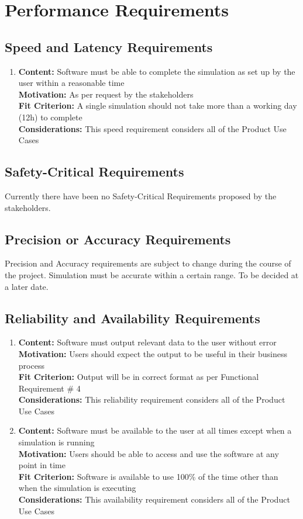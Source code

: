 \documentclass[paper=letter, fontsize=10pt]{scrartcl}
\numberwithin{equation}{section}		%
\numberwithin{figure}{section}			%
\numberwithin{table}{section}				%
\begin{document}
\section{Performance Requirements}
\subsection{Speed and Latency Requirements}
\begin{enumerate}
	\item \textbf{Content:} Software must be able to complete the simulation as set up by the user within a reasonable time
	\\	  \textbf{Motivation:} As per request by the stakeholders
	\\	  \textbf{Fit Criterion:} A single simulation should not take more than a working day (12h) to complete
	\\	  \textbf{Considerations:} This speed requirement considers all of the Product Use Cases
\end{enumerate}
\subsection{Safety-Critical Requirements}
Currently there have been no Safety-Critical Requirements proposed by the stakeholders.
\subsection{Precision or Accuracy Requirements}
Precision and Accuracy requirements are subject to change during the course of the project. Simulation must be accurate within a certain range. To be decided at a later date. 
\subsection{Reliability and Availability Requirements}
	\begin{enumerate}
		\item \textbf{Content:} Software must output relevant data to the user without error
		\\	  \textbf{Motivation:} Users should expect the output to be useful in their business process
		\\	  \textbf{Fit Criterion:} Output will be in correct format as per Functional Requirement \# 4
		\\	  \textbf{Considerations:} This reliability requirement considers all of the Product Use Cases 
		\item \textbf{Content:} Software must be available to the user at all times except when a simulation is running
		\\	  \textbf{Motivation:} Users should be able to access and use the software at any point in time
		\\	  \textbf{Fit Criterion:} Software is available to use 100\% of the time other than when the simulation is executing
		\\	  \textbf{Considerations:} This availability requirement considers all of the Product Use Cases 
	\end{enumerate}
\end{document}
